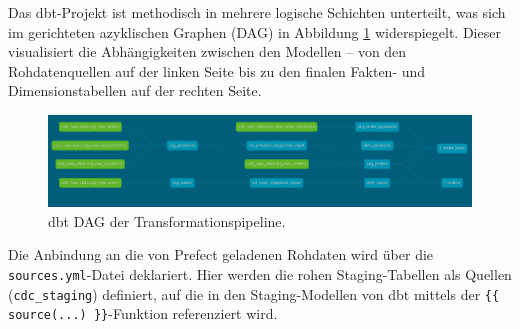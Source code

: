 \documentclass[
    12pt,               
    a4paper,        
    ngerman            
]{scrartcl}
\begin{document}
Das dbt-Projekt ist methodisch in mehrere logische Schichten unterteilt, was sich im gerichteten azyklischen Graphen (DAG) in Abbildung \ref{fig:dbt_dag} widerspiegelt. Dieser visualisiert die Abhängigkeiten zwischen den Modellen – von den Rohdatenquellen auf der linken Seite bis zu den finalen Fakten- und Dimensionstabellen auf der rechten Seite.

\begin{figure}[h!]
    \centering
    \includegraphics[width=\textwidth]{dbt_dag.png} %
    \caption{dbt DAG der Transformationspipeline.}
    \label{fig:dbt_dag}
\end{figure}

Die Anbindung an die von Prefect geladenen Rohdaten wird über die \texttt{sources.yml}-Datei deklariert. Hier werden die rohen Staging-Tabellen als Quellen (\texttt{cdc\_staging}) definiert, auf die in den Staging-Modellen von dbt mittels der \texttt{\{\{ source(...) \}\}}-Funktion referenziert wird.
\end{document}
